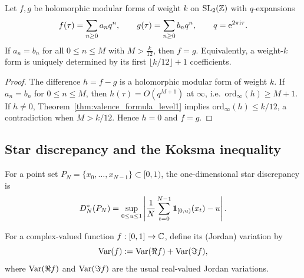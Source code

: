 \begin{corollary}
\label{cor:finite_determination_level1}
Let $f,g$ be holomorphic modular forms of weight $k$ on $\mathrm{SL}_2(\mathbb{Z})$ with $q$-expansions
\[
f(\tau)=\sum_{n\ge 0} a_n q^n,\qquad g(\tau)=\sum_{n\ge 0} b_n q^n,\qquad q=\mathrm{e}^{2\pi\mathrm{i}\tau}.
\]
If $a_n=b_n$ for all $0\le n\le M$ with $M>\frac{k}{12}$, then $f=g$.
Equivalently, a weight-$k$ form is uniquely determined by its first $\lfloor k/12\rfloor+1$ coefficients.
\end{corollary}
\begin{proof}
The difference $h=f-g$ is a holomorphic modular form of weight $k$. If $a_n=b_n$ for $0\le n\le M$, then $h(\tau)=O(q^{M+1})$ at $\infty$, i.e.\ $\mathrm{ord}_\infty(h)\ge M+1$.
If $h\neq 0$, Theorem~\ref{thm:valence_formula_level1} implies $\mathrm{ord}_\infty(h)\le k/12$, a contradiction when $M>k/12$. Hence $h=0$ and $f=g$.
\end{proof}

\subsection{Star discrepancy and the Koksma inequality}
\label{app:koksma_inequality}

For a point set $P_N=\{x_0,\dots,x_{N-1}\}\subset[0,1)$, the one-dimensional star discrepancy is
\begin{equation}
D_N^\ast(P_N)=\sup_{0\le u\le 1}\left|\frac{1}{N}\sum_{t=0}^{N-1}\mathbf{1}_{[0,u)}(x_t)-u\right|.
\end{equation}

\begin{definition}
\label{def:complex_variation}
For a complex-valued function $f:[0,1]\to\mathbb{C}$, define its (Jordan) variation by
\begin{equation}
\mathrm{Var}(f):=\mathrm{Var}(\Re f)+\mathrm{Var}(\Im f),
\end{equation}
where $\mathrm{Var}(\Re f)$ and $\mathrm{Var}(\Im f)$ are the usual real-valued Jordan variations.
\end{definition}

